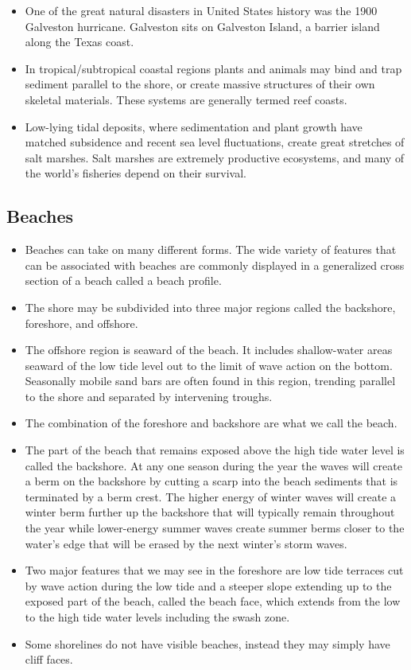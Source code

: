 \documentclass{article}
\begin{document}
\begin{itemize}
		\item One of the great natural disasters in United States history was the 1900 Galveston hurricane.  Galveston sits on Galveston Island, a barrier island along the Texas coast. 
		\item In tropical/subtropical coastal regions plants and animals may bind and trap sediment parallel to the shore, or create massive structures of their own skeletal materials. These systems are generally termed reef coasts.
		\item Low-lying tidal deposits, where sedimentation and plant growth have matched subsidence and recent sea level fluctuations, create great stretches of salt marshes. Salt marshes are extremely productive ecosystems, and many of the world's fisheries depend on their survival.
	\end{itemize}
	
	\subsection{Beaches}
	\begin{itemize}
		\item Beaches can take on many different forms.  The wide variety of features that can be associated with beaches are commonly displayed in a generalized cross section of a beach called a beach profile.
		\item The shore may be subdivided into three major regions called the backshore, foreshore, and offshore.
		\item The offshore region is seaward of the beach.  It includes shallow-water areas seaward of the low tide level out to the limit of wave action on the bottom.  Seasonally mobile sand bars are often found in this region, trending parallel to the shore and separated by intervening troughs.
		\item The combination of the foreshore and backshore are what we call the beach.
		\item The part of the beach that remains exposed above the high tide water level is called the backshore.  At any one season during the year the waves will create a berm on the backshore by cutting a scarp into the beach sediments that is terminated by a berm crest.  The higher energy of winter waves will create a winter berm further up the backshore that will typically remain throughout the year while lower-energy summer waves create summer berms closer to the water's edge that will be erased by the next winter's storm waves.
		\item Two major features that we may see in the foreshore are low tide terraces cut by wave action during the low tide and a steeper slope extending up to the exposed part of the beach, called the beach face, which extends from the low to the high tide water levels including the swash zone.
		\item Some shorelines do not have visible beaches, instead they may simply have cliff faces.
	\end{itemize}
\end{document}
